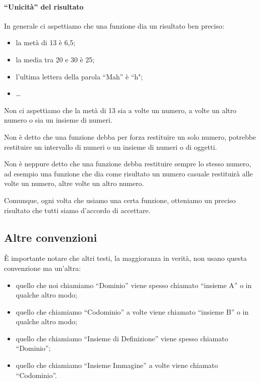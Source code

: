\begin{osservazione}
\paragraph{``Unicità'' del risultato}

In generale ci aspettiamo che una funzione dia un risultato ben preciso:
\begin{itemize} [nosep]
 \item la metà di 13 è 6,5;
 \item la media tra 20 e 30 è 25;
 \item l'ultima lettera della parola  ``Mah'' è  ``h";
 \item \dots
\end{itemize}

Non ci aspettiamo che la metà di 13 sia a volte un numero, a volte un altro 
numero o sia un insieme di numeri.

Non è detto che una funzione debba per forza restituire un solo numero, 
potrebbe restituire un intervallo di numeri o un insieme di numeri o di 
oggetti.

Non è neppure detto che una funzione debba restituire sempre lo stesso 
numero, ad esempio una funzione che dia come risultato un numero casuale 
restituirà alle volte un numero, altre volte un altro numero.

Comunque, ogni volta che usiamo una certa funzione, otteniamo un preciso 
risultato che tutti siamo d'accordo di accettare.
\end{osservazione}

\subsection{Altre convenzioni}

È importante notare che altri testi, la maggioranza in verità, non usano 
questa convenzione ma un'altra:

\begin{itemize} [nosep]
 \item quello che noi chiamiamo ``Dominio'' viene spesso chiamato  
``insieme A'' o in qualche altro modo;
 \item quello che chiamiamo ``Codominio'' a volte viene chiamato  ``insieme 
B'' o in qualche altro modo;
 \item quello che chiamiamo ``Insieme di Definizione'' viene spesso 
chiamato ``Dominio'';
 \item quello che chiamiamo ``Insieme Immagine'' a volte viene chiamato 
``Codominio''.
\end{itemize}

